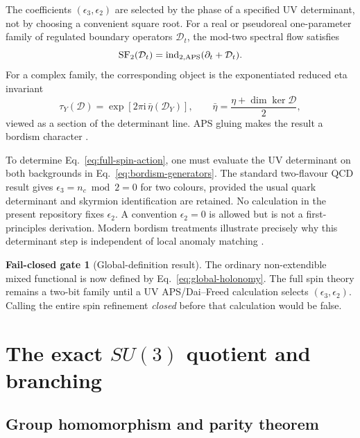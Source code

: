 \documentclass[11pt]{article}
\theoremstyle{definition}
\newtheorem{gate}[theorem]{Fail-closed gate}
\theoremstyle{remark}
\newcommand{\ii}{\mathrm i}
\newcommand{\ind}{\operatorname{ind}}
\begin{document}
The coefficients \((\epsilon_3,\epsilon_2)\) are selected by the phase of a
specified UV determinant, not by choosing a convenient square root.  For a
real or pseudoreal one-parameter family of regulated boundary operators
\(\mathcal D_t\), the mod-two spectral flow satisfies
\begin{equation}
 \operatorname{SF}_2(\mathcal D_t)
 =\ind_{2,{\rm APS}}(\partial_t+\mathcal D_t).
 \label{eq:aps-spectral-flow}
\end{equation}
For a complex family, the corresponding object is the exponentiated reduced
eta invariant
\begin{equation}
 \tau_Y(\mathcal D)=
 \exp\!\left[2\pi\ii\,\bar\eta(\mathcal D_Y)\right],
 \qquad
 \bar\eta=\frac{\eta+\dim\ker\mathcal D}{2},
 \label{eq:dai-freed}
\end{equation}
viewed as a section of the determinant line.  APS gluing makes the result a
bordism character \cite{AtiyahPatodiSinger1975,DaiFreed1994}.

To determine Eq.~\eqref{eq:full-spin-action}, one must evaluate the UV
determinant on both backgrounds in Eq.~\eqref{eq:bordism-generators}.  The
standard two-flavour QCD result gives
\(\epsilon_3=n_c\bmod2=0\) for two colours, provided the usual quark
determinant and skyrmion identification are retained.  No calculation in the
present repository fixes \(\epsilon_2\).  A convention
\(\epsilon_2=0\) is allowed but is not a first-principles derivation.  Modern
bordism treatments illustrate precisely why this determinant step is
independent of local anomaly matching \cite{Freed2008,Saito2024Global}.

\begin{gate}[Global-definition result]
The ordinary non-extendible mixed functional is now defined by
Eq.~\eqref{eq:global-holonomy}.  The full spin theory remains a two-bit family
until a UV APS/Dai--Freed calculation selects \((\epsilon_3,\epsilon_2)\).
Calling the entire spin refinement \emph{closed} before that calculation
would be false.
\end{gate}

\section{The exact \texorpdfstring{\(SU(3)\)}{SU(3)} quotient and branching}

\subsection{Group homomorphism and parity theorem}
\end{document}
